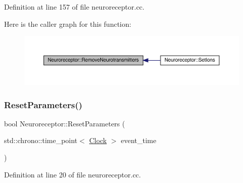 Definition at line 157 of file neuroreceptor.\+cc.

Here is the caller graph for this function\+:\nopagebreak
\begin{figure}[H]
\begin{center}
\leavevmode
\includegraphics[width=350pt]{class_neuroreceptor_ad760106ce6194ac02959c1882bd0f327_icgraph}
\end{center}
\end{figure}
\mbox{\label{class_neuroreceptor_a30debeb0311d92eb6abe354409c15d09}} 
\subsubsection{\texorpdfstring{Reset\+Parameters()}{ResetParameters()}}
{\footnotesize\ttfamily bool Neuroreceptor\+::\+Reset\+Parameters (\begin{DoxyParamCaption}\item[{std\+::chrono\+::time\+\_\+point$<$ \hyperlink{universe_8h_a0ef8d951d1ca5ab3cfaf7ab4c7a6fd80}{Clock} $>$}]{event\+\_\+time }\end{DoxyParamCaption})}



Definition at line 20 of file neuroreceptor.\+cc.

